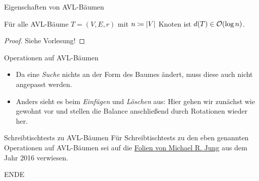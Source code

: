 \begin{frame}{Eigenschaften von AVL-B\"aumen}
\begin{theorem}
F\"ur alle AVL-B\"aume $T = (V, E, r)$ mit $n \coloneqq \vert V\vert$ Knoten ist $d(T) \in \mathcal{O}(\log n)$.
\end{theorem}
\begin{proof}
Siehe Vorlesung!
\end{proof}
\end{frame}

\begin{frame}{Operationen auf AVL-B\"aumen}

\begin{itemize}
    \item<+-> Da eine \emph{Suche} nichts an der Form des Baumes \"andert, muss diese auch nicht angepasst werden.
    \item<+-> Anders sieht es beim \emph{Einf\"ugen} und \emph{L\"oschen} aus: Hier gehen wir zun\"achst wie gewohnt vor und stellen die Balance anschlie{\ss}end durch \alert{Rotationen} wieder her.
\end{itemize}
\end{frame}

\begin{frame}{Schreibtischtests zu AVL-B\"aumen}
F\"ur Schreibtischtests zu den eben genannten Operationen auf AVL-B\"aumen sei auf die \alert{\href{https://www2.informatik.hu-berlin.de/~mjung/Tutorium/AlgoDat2016/folien10.pdf}{Folien von Michael R. Jung}} aus dem Jahr 2016 verwiesen.
\end{frame}

\begin{frame}[plain, c]
\begin{center}
\Huge{ENDE}
\end{center}
\end{frame}